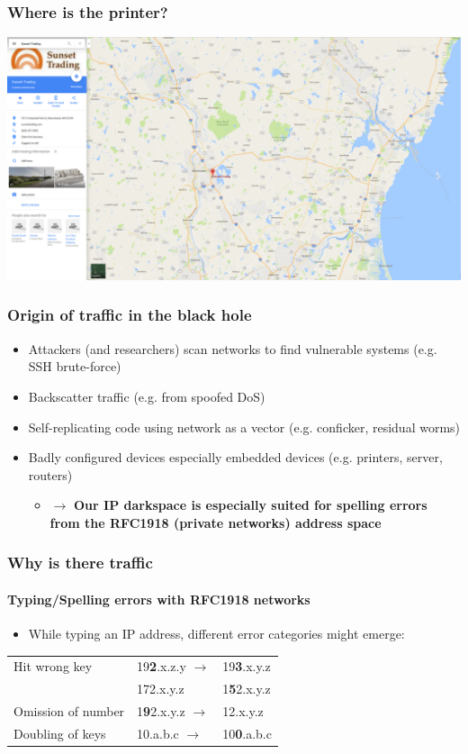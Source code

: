 \documentclass{beamer}
\begin{document}
\begin{frame}
\frametitle{Where is the printer?}
\includegraphics[scale=0.20]{sunset.png}
\end{frame}

\begin{frame}
\frametitle{Origin of traffic in the black hole}
\begin{itemize}
    \item Attackers (and researchers) scan networks to find vulnerable systems (e.g. SSH brute-force)
    \item Backscatter traffic (e.g. from spoofed DoS)
    \item Self-replicating code using network as a vector (e.g. conficker, residual worms)
    \item Badly configured devices especially embedded devices (e.g. printers, server, routers)
    \begin{itemize}
        \item $\rightarrow$ \textbf{Our IP darkspace is especially suited for spelling errors from the RFC1918 (private networks) address space}
    \end{itemize}
\end{itemize}
\end{frame}

\begin{frame}
\frametitle{Why is there traffic}
\framesubtitle{Typing/Spelling errors with RFC1918 networks}
    \begin{itemize}
        \item While typing an IP address, different error categories might emerge:
\end{itemize}
\begin{tabular}{lll}
Hit wrong key & 19\textbf{2}.x.z.y $\rightarrow$ & 19\textbf{3}.x.y.z\\
&172.x.y.z & 1\textbf{5}2.x.y.z\\
Omission of number & 1\textbf{9}2.x.y.z $\rightarrow$ &12.x.y.z\\
Doubling of keys &10.a.b.c $\rightarrow$ & 10\textbf{0}.a.b.c\\
\end{tabular}

\end{frame}
\end{document}

